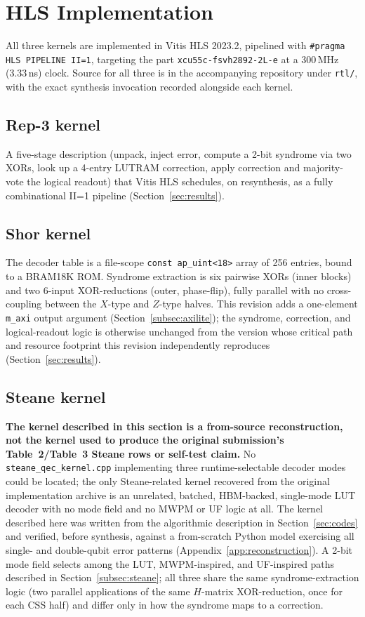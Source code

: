 \section{HLS Implementation}\label{sec:implementation}

All three kernels are implemented in Vitis HLS 2023.2, pipelined with \texttt{\#pragma HLS PIPELINE II=1}, targeting the part \texttt{xcu55c-fsvh2892-2L-e} at a 300\,MHz (3.33\,ns) clock. Source for all three is in the accompanying repository under \texttt{rtl/}, with the exact synthesis invocation recorded alongside each kernel.

\subsection{Rep-3 kernel}\label{subsec:impl-rep3}
A five-stage description (unpack, inject error, compute a 2-bit syndrome via two XORs, look up a 4-entry LUTRAM correction, apply correction and majority-vote the logical readout) that Vitis HLS schedules, on resynthesis, as a fully combinational II=1 pipeline (Section~\ref{sec:results}).

\subsection{Shor kernel}\label{subsec:impl-shor}
The decoder table is a file-scope \texttt{const ap\_uint<18>} array of 256 entries, bound to a BRAM18K ROM. Syndrome extraction is six pairwise XORs (inner blocks) and two 6-input XOR-reductions (outer, phase-flip), fully parallel with no cross-coupling between the \(X\)-type and \(Z\)-type halves. This revision adds a one-element \texttt{m\_axi} output argument (Section~\ref{subsec:axilite}); the syndrome, correction, and logical-readout logic is otherwise unchanged from the version whose critical path and resource footprint this revision independently reproduces (Section~\ref{sec:results}).

\subsection{Steane kernel}\label{subsec:impl-steane}
\textbf{The kernel described in this section is a from-source reconstruction, not the kernel used to produce the original submission's Table~2/Table~3 Steane rows or self-test claim.} No \texttt{steane\_qec\_kernel.cpp} implementing three runtime-selectable decoder modes could be located; the only Steane-related kernel recovered from the original implementation archive is an unrelated, batched, HBM-backed, single-mode LUT decoder with no mode field and no MWPM or UF logic at all. The kernel described here was written from the algorithmic description in Section~\ref{sec:codes} and verified, before synthesis, against a from-scratch Python model exercising all single- and double-qubit error patterns (Appendix~\ref{app:reconstruction}). A 2-bit mode field selects among the LUT, MWPM-inspired, and UF-inspired paths described in Section~\ref{subsec:steane}; all three share the same syndrome-extraction logic (two parallel applications of the same \(H\)-matrix XOR-reduction, once for each CSS half) and differ only in how the syndrome maps to a correction.
